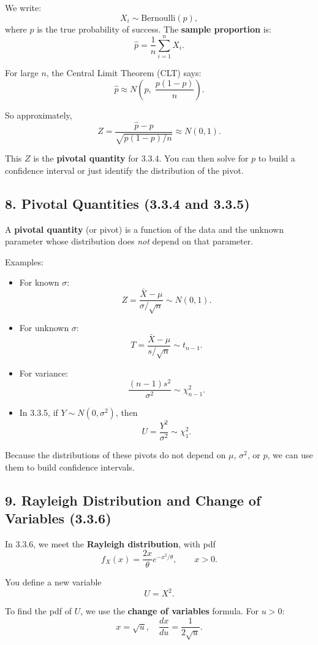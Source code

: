 \documentclass[11pt,letterpaper]{article}
\theoremstyle{remark}
\begin{document}
We write:
\[
X_i \sim \text{Bernoulli}(p),
\]
where $p$ is the true probability of success. The \textbf{sample proportion} is:
\[
\hat{p} = \frac{1}{n}\sum_{i=1}^n X_i.
\]

For large $n$, the Central Limit Theorem (CLT) says:
\[
\hat{p} \approx N\left(p,\; \frac{p(1-p)}{n}\right).
\]

So approximately,
\[
Z = \frac{\hat{p} - p}{\sqrt{p(1-p)/n}} \approx N(0,1).
\]

This $Z$ is the \textbf{pivotal quantity} for 3.3.4.
You can then solve for $p$ to build a confidence interval or just identify the distribution of the pivot.

\subsection*{8. Pivotal Quantities (3.3.4 and 3.3.5)}

A \textbf{pivotal quantity} (or pivot) is a function of the data and the unknown parameter whose distribution does \emph{not} depend on that parameter.

Examples:
\begin{itemize}
    \item For known $\sigma$:
    \[
    Z = \frac{\bar{X} - \mu}{\sigma/\sqrt{n}} \sim N(0,1).
    \]
    \item For unknown $\sigma$:
    \[
    T = \frac{\bar{X} - \mu}{s/\sqrt{n}} \sim t_{n-1}.
    \]
    \item For variance:
    \[
    \frac{(n-1)s^2}{\sigma^2} \sim \chi^2_{n-1}.
    \]
    \item In 3.3.5, if $Y \sim N(0,\sigma^2)$, then
    \[
    U = \frac{Y^2}{\sigma^2} \sim \chi^2_1.
    \]
\end{itemize}

Because the distributions of these pivots do not depend on $\mu$, $\sigma^2$, or $p$, we can use them to build confidence intervals.

\subsection*{9. Rayleigh Distribution and Change of Variables (3.3.6)}

In 3.3.6, we meet the \textbf{Rayleigh distribution}, with pdf
\[
f_X(x) = \frac{2x}{\theta} e^{-x^2/\theta}, \qquad x > 0.
\]

You define a new variable
\[
U = X^2.
\]

To find the pdf of $U$, we use the \textbf{change of variables} formula.
For $u>0$:
\[
x = \sqrt{u},\quad \frac{dx}{du} = \frac{1}{2\sqrt{u}}.
\]
\end{document}
